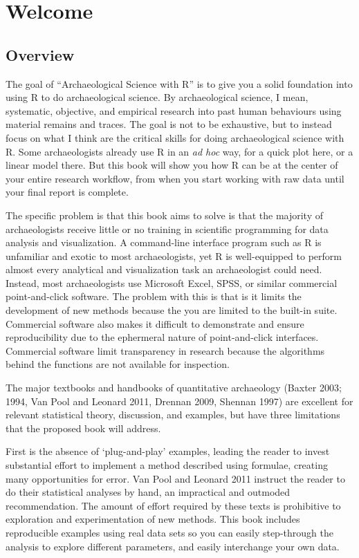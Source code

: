 \chapter{Welcome}

\section{Overview}

The goal of ``Archaeological Science with R'' is to give you a solid
foundation into using R to do archaeological science. By archaeological
science, I mean, systematic, objective, and empirical research into past
human behaviours using material remains and traces. The goal is not to
be exhaustive, but to instead focus on what I think are the critical
skills for doing archaeological science with R. Some archaeologists
already use R in an \emph{ad hoc} way, for a quick plot here, or a
linear model there. But this book will show you how R can be at the
center of your entire research workflow, from when you start working
with raw data until your final report is complete.

The specific problem is that this book aims to solve is that the
majority of archaeologists receive little or no training in scientific
programming for data analysis and visualization. A command-line
interface program such as R is unfamiliar and exotic to most
archaeologists, yet R is well-equipped to perform almost every
analytical and visualization task an archaeologist could need. Instead,
most archaeologists use Microsoft Excel, SPSS, or similar commercial
point-and-click software. The problem with this is that is it limits the
development of new methods because the you are limited to the built-in
suite. Commercial software also makes it difficult to demonstrate and
ensure reproducibility due to the ephermeral nature of point-and-click
interfaces. Commercial software limit transparency in research because
the algorithms behind the functions are not available for inspection.

The major textbooks and handbooks of quantitative archaeology (Baxter
2003; 1994, Van Pool and Leonard 2011, Drennan 2009, Shennan 1997) are
excellent for relevant statistical theory, discussion, and examples, but
have three limitations that the proposed book will address.

First is the absence of `plug-and-play' examples, leading the reader to
invest substantial effort to implement a method described using
formulae, creating many opportunities for error. Van Pool and Leonard
2011 instruct the reader to do their statistical analyses by hand, an
impractical and outmoded recommendation. The amount of effort required
by these texts is prohibitive to exploration and experimentation of new
methods. This book includes reproducible examples using real data sets
so you can easily step-through the analysis to explore different
parameters, and easily interchange your own data.

